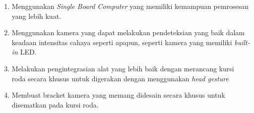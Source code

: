 \begin{enumerate}[nolistsep]

  \item Menggunakan \emph{Single Board Computer} yang memiliki kemampuan pemrosesan yang lebih kuat.

  \item Menggunakan kamera yang dapat melakukan pendeteksian yang baik dalam keadaan intensitas cahaya seperti apapun, seperti kamera yang memiliki \emph{built-in} LED.

  \item Melakukan pengintegrasian alat yang lebih baik dengan merancang kursi roda secara khusus untuk digerakan dengan menggunakan \emph{head gesture}
  

  \item Membuat bracket kamera yang memang didesain secara khusus untuk disematkan pada kursi roda.

\end{enumerate}
